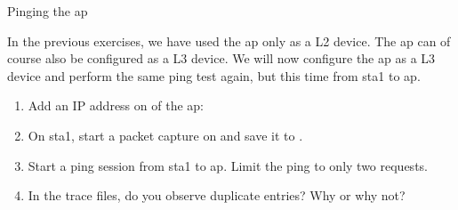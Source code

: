 \begin{exercise}{Pinging the \ac{ap}}

In the previous exercises, we have used the \ac{ap} only as a L2 device. The \ac{ap} can of course also be configured as a L3 device. We will now configure the \ac{ap} as a L3 device and perform the same ping test again, but this time from \ac{sta}1 to \ac{ap}.
	\begin{enumerate}
		\item Add an IP address on  of the \ac{ap}: \newline
		\item On \ac{sta}1, start a packet capture on  and save it to . \newline
		\item Start a ping session from \ac{sta}1 to \ac{ap}. Limit the ping to only two requests. \label{ex:1-3}\newline
		\item In the trace files, do you observe duplicate entries? Why or why not?\newline
		\begin{esolution}
		\end{esolution}
	\end{enumerate}

\end{exercise}



